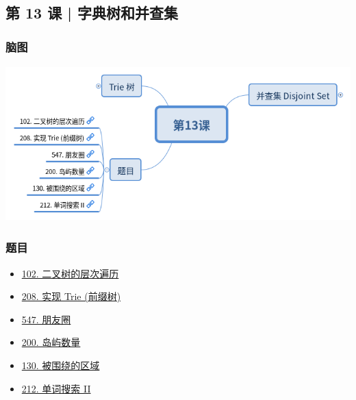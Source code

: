 \subsection{第 13 课 | 字典树和并查集}

\subsubsection{脑图}

\includegraphics[width=140mm,height=60mm]{images/camp/第13课.png}

\subsubsection{题目}

\begin{itemize}
  \item \hyperref[leetcode:102]{102. 二叉树的层次遍历}
  \item \hyperref[leetcode:208]{208. 实现 Trie (前缀树)}
  \item \hyperref[leetcode:547]{547. 朋友圈}
  \item \hyperref[leetcode:200]{200. 岛屿数量}
  \item \hyperref[leetcode:130]{130. 被围绕的区域}
  \item \hyperref[leetcode:212]{212. 单词搜索 II}
\end{itemize}
